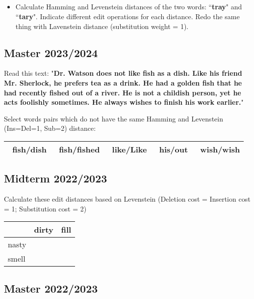 \documentclass[11pt, a4paper]{article}
\begin{document}
\subsection{}

\begin{itemize}
	\item Calculate Hamming and Levenstein distances of the two words: ``\textbf{tray}" and ``\textbf{tary}".
	Indicate different edit operations for each distance. Redo the same thing with Lavenstein distance (substitution weight = 1).
\end{itemize}

\subsection{Master 2023/2024}

Read this text: "\textbf{Dr. Watson does not like fish as a dish. Like his friend Mr. Sherlock, he prefers tea as a drink. He had a golden fish that he had recently fished out of a river.  He is not a childish person, yet he acts foolishly sometimes. He always wishes to finish his work earlier.}"

Select words pairs which do not have the same Hamming and Levenstein (Ins=Del=1, Sub=2) distance:
\begin{center}
	\begin{tabular}{|lllll|}
		\hline
		\Square\ fish/dish & 
		\Square\ fish/fished & 
		\Square\ like/Like & 
		\Square\ his/out &
		\Square\ wish/wish\\
		\hline
	\end{tabular}
\end{center}

\subsection{Midterm 2022/2023}

Calculate these edit distances based on Levenstein (Deletion cost = Insertion cost = 1; Substitution cost = 2) 
\begin{center}
	\begin{tabular}{|l|p{2cm}|p{2cm}|}
		\hline
		& dirty & fill \\
		\hline
		nasty & & \\
		\hline
		smell & & \\
		\hline
	\end{tabular}
\end{center}

\subsection{Master 2022/2023}
\end{document}
